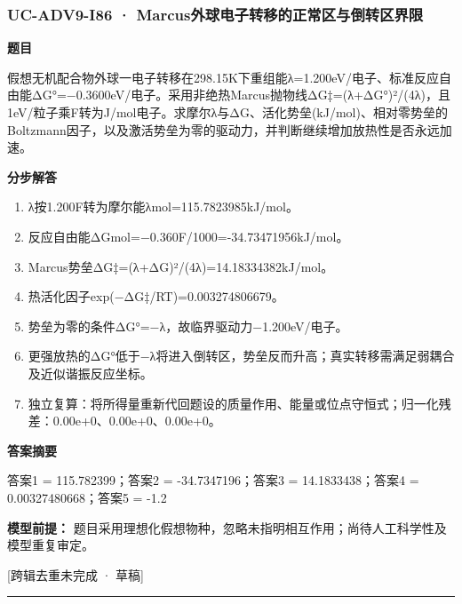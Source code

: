 \documentclass[UTF8,11pt,a4paper]{ctexart}
\begin{document}
\subsubsection*{UC-ADV9-I86 · Marcus外球电子转移的正常区与倒转区界限}
\noindent\textbf{题目}\par
假想无机配合物外球一电子转移在298.15K下重组能λ=1.200eV/电子、标准反应自由能ΔG°=−0.3600eV/电子。采用非绝热Marcus抛物线ΔG‡=(λ+ΔG°)²/(4λ)，且1eV/粒子乘F转为J/mol电子。求摩尔λ与ΔG、活化势垒(kJ/mol)、相对零势垒的Boltzmann因子，以及激活势垒为零的驱动力，并判断继续增加放热性是否永远加速。\par
\medskip\noindent\textbf{分步解答}
\begin{enumerate}
\item λ按1.200F转为摩尔能λmol=115.7823985kJ/mol。
\item 反应自由能ΔGmol=−0.360F/1000=-34.73471956kJ/mol。
\item Marcus势垒ΔG‡=(λ+ΔG)²/(4λ)=14.18334382kJ/mol。
\item 热活化因子exp(−ΔG‡/RT)=0.003274806679。
\item 势垒为零的条件ΔG°=−λ，故临界驱动力−1.200eV/电子。
\item 更强放热的ΔG°低于−λ将进入倒转区，势垒反而升高；真实转移需满足弱耦合及近似谐振反应坐标。
\item 独立复算：将所得量重新代回题设的质量作用、能量或位点守恒式；归一化残差：0.00e+0、0.00e+0、0.00e+0。
\end{enumerate}
\noindent\textbf{答案摘要}\par
答案1 = 115.782399；答案2 = -34.7347196；答案3 = 14.1833438；答案4 = 0.00327480668；答案5 = -1.2\par
\noindent\textbf{模型前提：}
题目采用理想化假想物种，忽略未指明相互作用；尚待人工科学性及模型重复审定。\par
\noindent\textcolor{red!65!black}{[跨辑去重未完成 · 草稿]} \par
\medskip\hrule\medskip
{}
\end{document}
